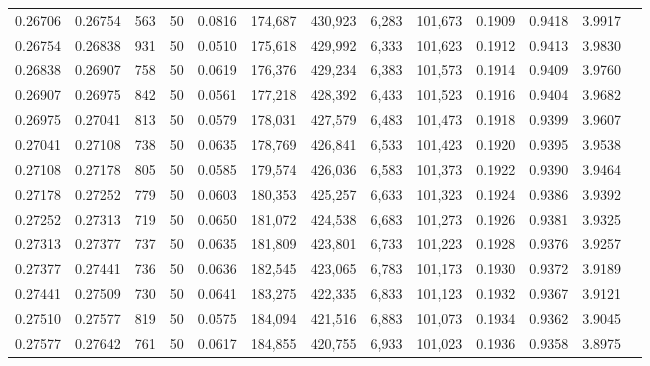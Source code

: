 \begin{tabular}{rrrrrrrrrrrrr}
0.26706 & 0.26754 &   563 &  50 &                                     0.0816 & 174,687 & 430,923 &   6,283 & 101,673 & 0.1909 & 0.9418 & 3.9917 \\
0.26754 & 0.26838 &   931 &  50 &                                     0.0510 & 175,618 & 429,992 &   6,333 & 101,623 & 0.1912 & 0.9413 & 3.9830 \\
0.26838 & 0.26907 &   758 &  50 &                                     0.0619 & 176,376 & 429,234 &   6,383 & 101,573 & 0.1914 & 0.9409 & 3.9760 \\
0.26907 & 0.26975 &   842 &  50 &                                     0.0561 & 177,218 & 428,392 &   6,433 & 101,523 & 0.1916 & 0.9404 & 3.9682 \\
0.26975 & 0.27041 &   813 &  50 &                                     0.0579 & 178,031 & 427,579 &   6,483 & 101,473 & 0.1918 & 0.9399 & 3.9607 \\
0.27041 & 0.27108 &   738 &  50 &                                     0.0635 & 178,769 & 426,841 &   6,533 & 101,423 & 0.1920 & 0.9395 & 3.9538 \\
0.27108 & 0.27178 &   805 &  50 &                                     0.0585 & 179,574 & 426,036 &   6,583 & 101,373 & 0.1922 & 0.9390 & 3.9464 \\
0.27178 & 0.27252 &   779 &  50 &                                     0.0603 & 180,353 & 425,257 &   6,633 & 101,323 & 0.1924 & 0.9386 & 3.9392 \\
0.27252 & 0.27313 &   719 &  50 &                                     0.0650 & 181,072 & 424,538 &   6,683 & 101,273 & 0.1926 & 0.9381 & 3.9325 \\
0.27313 & 0.27377 &   737 &  50 &                                     0.0635 & 181,809 & 423,801 &   6,733 & 101,223 & 0.1928 & 0.9376 & 3.9257 \\
0.27377 & 0.27441 &   736 &  50 &                                     0.0636 & 182,545 & 423,065 &   6,783 & 101,173 & 0.1930 & 0.9372 & 3.9189 \\
0.27441 & 0.27509 &   730 &  50 &                                     0.0641 & 183,275 & 422,335 &   6,833 & 101,123 & 0.1932 & 0.9367 & 3.9121 \\
0.27510 & 0.27577 &   819 &  50 &                                     0.0575 & 184,094 & 421,516 &   6,883 & 101,073 & 0.1934 & 0.9362 & 3.9045 \\
0.27577 & 0.27642 &   761 &  50 &                                     0.0617 & 184,855 & 420,755 &   6,933 & 101,023 & 0.1936 & 0.9358 & 3.8975 \\

\end{tabular}

